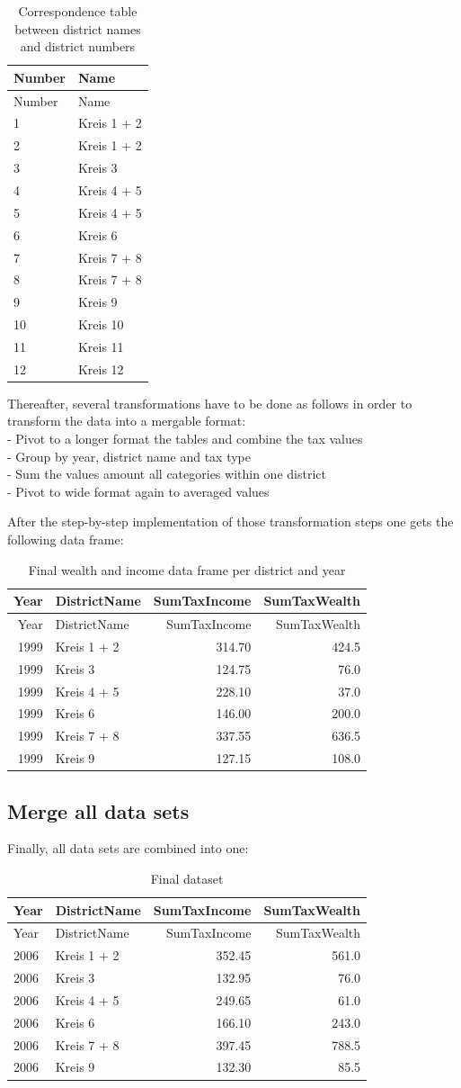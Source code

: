 \documentclass[
]{article}
\begin{document}
\begin{longtable}[]{@{}ll@{}}
\caption{Correspondence table between district names and district
numbers}\tabularnewline
\toprule
Number & Name\tabularnewline
\midrule
\endfirsthead
\toprule
Number & Name\tabularnewline
\midrule
\endhead
1 & Kreis 1 + 2\tabularnewline
2 & Kreis 1 + 2\tabularnewline
3 & Kreis 3\tabularnewline
4 & Kreis 4 + 5\tabularnewline
5 & Kreis 4 + 5\tabularnewline
6 & Kreis 6\tabularnewline
7 & Kreis 7 + 8\tabularnewline
8 & Kreis 7 + 8\tabularnewline
9 & Kreis 9\tabularnewline
10 & Kreis 10\tabularnewline
11 & Kreis 11\tabularnewline
12 & Kreis 12\tabularnewline
\bottomrule
\end{longtable}

Thereafter, several transformations have to be done as follows in order
to transform the data into a mergable format:\\
- Pivot to a longer format the tables and combine the tax values\\
- Group by year, district name and tax type\\
- Sum the values amount all categories within one district\\
- Pivot to wide format again to averaged values

After the step-by-step implementation of those transformation steps one
gets the following data frame:

\begin{longtable}[]{@{}rlrr@{}}
\caption{Final wealth and income data frame per district and
year}\tabularnewline
\toprule
Year & DistrictName & SumTaxIncome & SumTaxWealth\tabularnewline
\midrule
\endfirsthead
\toprule
Year & DistrictName & SumTaxIncome & SumTaxWealth\tabularnewline
\midrule
\endhead
1999 & Kreis 1 + 2 & 314.70 & 424.5\tabularnewline
1999 & Kreis 3 & 124.75 & 76.0\tabularnewline
1999 & Kreis 4 + 5 & 228.10 & 37.0\tabularnewline
1999 & Kreis 6 & 146.00 & 200.0\tabularnewline
1999 & Kreis 7 + 8 & 337.55 & 636.5\tabularnewline
1999 & Kreis 9 & 127.15 & 108.0\tabularnewline
\bottomrule
\end{longtable}

\hypertarget{merge-all-data-sets}{%
\subsection{Merge all data sets}\label{merge-all-data-sets}}

Finally, all data sets are combined into one:

\begin{longtable}[]{@{}llrr@{}}
\caption{Final dataset}\tabularnewline
\toprule
Year & DistrictName & SumTaxIncome & SumTaxWealth\tabularnewline
\midrule
\endfirsthead
\toprule
Year & DistrictName & SumTaxIncome & SumTaxWealth\tabularnewline
\midrule
\endhead
2006 & Kreis 1 + 2 & 352.45 & 561.0\tabularnewline
2006 & Kreis 3 & 132.95 & 76.0\tabularnewline
2006 & Kreis 4 + 5 & 249.65 & 61.0\tabularnewline
2006 & Kreis 6 & 166.10 & 243.0\tabularnewline
2006 & Kreis 7 + 8 & 397.45 & 788.5\tabularnewline
2006 & Kreis 9 & 132.30 & 85.5\tabularnewline
\bottomrule
\end{longtable}
\end{document}
